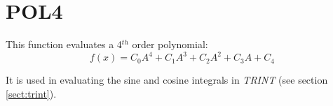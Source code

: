 \section{POL4}
\label{sect:pol4}

\noindent This function evaluates a 4$^{th}$ order polynomial:\\

\begin{equation}
f(x) = C_0 A^4 + C_1 A^3 + C_2 A^2 + C_3 A + C_4
\end{equation}

\noindent It is used in evaluating the sine and cosine integrals in {\em
TRINT} (see section \ref{sect:trint}).\\

